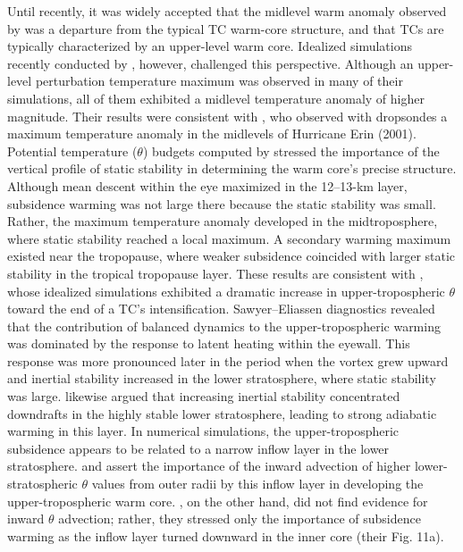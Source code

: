 Until recently, it was widely accepted that the midlevel warm anomaly observed by \cite{HawkinsImbembo1976} was a departure from the typical TC warm-core structure, and that TCs are typically characterized by an upper-level warm core.
Idealized simulations recently conducted by \cite{SternNolan2012}, however, challenged this perspective.
Although an upper-level perturbation temperature maximum was observed in many of their simulations, all of them exhibited a midlevel temperature anomaly of higher magnitude.
Their results were consistent with \cite{Halversonetal2006}, who observed with dropsondes a maximum temperature anomaly in the midlevels of Hurricane Erin (2001).
Potential temperature ($\theta$) budgets computed by \cite{SternZhang2013} stressed the importance of the vertical profile of static stability in determining the warm core’s precise structure.
Although mean descent within the eye maximized in the 12--13-km layer, subsidence warming was not large there because the static stability was small.
Rather, the maximum temperature anomaly developed in the midtroposphere, where static stability reached a local maximum.
A secondary warming maximum existed near the tropopause, where weaker subsidence coincided with larger static stability in the tropical tropopause layer.
These results are consistent with \cite{OhnoSatoh2015}, whose idealized simulations exhibited a dramatic increase in upper-tropospheric $\theta$ toward the end of a TC’s intensification.
Sawyer--Eliassen diagnostics \cite{PendergrassWilloughby2009} revealed that the contribution of balanced dynamics to the upper-tropospheric warming was dominated by the response to latent heating within the eyewall.
This response was more pronounced later in the period when the vortex grew upward and inertial stability increased in the lower stratosphere, where static stability was large.
\cite{ZhangChen2012} likewise argued that increasing inertial stability concentrated downdrafts in the highly stable lower stratosphere, leading to strong adiabatic warming in this layer.
In numerical simulations, the upper-tropospheric subsidence appears to be related to a narrow inflow layer in the lower stratosphere.
\cite{ChenZhang2013} and \cite{ChenGopalakrishnan2015} assert the importance of the inward advection of higher lower-stratospheric $\theta$ values from outer radii by this inflow layer in developing the upper-tropospheric warm core.
\cite{Kieuetal2016}, on the other hand, did not find evidence for inward $\theta$ advection; rather, they stressed only the importance of subsidence warming as the inflow layer turned downward in the inner core (their Fig. 11a).

